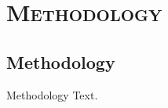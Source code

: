 \section{\scshape Methodology}\label{sec:methodology}

\subsection{Methodology}
\begin{frame}{Methodology}
	Text.
\end{frame}

